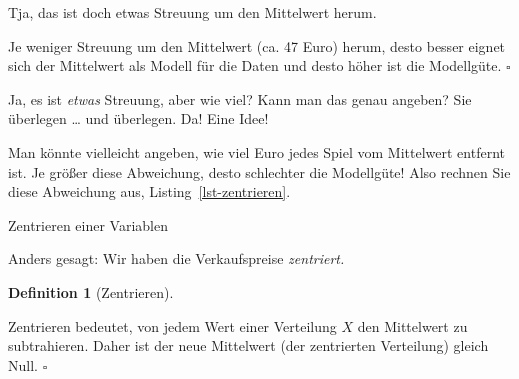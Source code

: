\documentclass[
  letterpaper,
  twoside,
  open=any]{scrbook}
\newenvironment{Shaded}{\begin{snugshade}}{\end{snugshade}}
\newcommand{\AttributeTok}[1]{\textcolor[rgb]{0.40,0.45,0.13}{#1}}
\newcommand{\FloatTok}[1]{\textcolor[rgb]{0.68,0.00,0.00}{#1}}
\newcommand{\FunctionTok}[1]{\textcolor[rgb]{0.28,0.35,0.67}{#1}}
\newcommand{\NormalTok}[1]{\textcolor[rgb]{0.00,0.23,0.31}{#1}}
\newcommand{\OtherTok}[1]{\textcolor[rgb]{0.00,0.23,0.31}{#1}}
\newcommand{\SpecialCharTok}[1]{\textcolor[rgb]{0.37,0.37,0.37}{#1}}
\theoremstyle{definition}
\theoremstyle{definition}
\theoremstyle{definition}
\newtheorem{definition}{Definition}[chapter]
\theoremstyle{remark}
\begin{document}
Tja, das ist doch etwas Streuung um den Mittelwert herum.

\begin{tcolorbox}[enhanced jigsaw, colframe=quarto-callout-important-color-frame, arc=.35mm, leftrule=.75mm, bottomtitle=1mm, titlerule=0mm, colbacktitle=quarto-callout-important-color!10!white, breakable, bottomrule=.15mm, colback=white, left=2mm, rightrule=.15mm, opacityback=0, toptitle=1mm, toprule=.15mm, opacitybacktitle=0.6, title=\textcolor{quarto-callout-important-color}{\faExclamation}\hspace{0.5em}{Wichtig}, coltitle=black]

Je weniger Streuung um den Mittelwert (ca. 47 Euro) herum, desto besser
eignet sich der Mittelwert als Modell für die Daten und desto höher ist
die Modellgüte. \(\square\)

\end{tcolorbox}

Ja, es ist \emph{etwas} Streuung, aber wie viel? Kann man das genau
angeben? Sie überlegen \ldots{} und überlegen. Da! Eine Idee!

Man könnte vielleicht angeben, wie viel Euro jedes Spiel vom Mittelwert
entfernt ist. Je größer diese Abweichung, desto schlechter die
Modellgüte! Also rechnen Sie diese Abweichung aus,
Listing~\ref{lst-zentrieren}.

\begin{codelisting}

\caption{\label{lst-zentrieren}Zentrieren einer Variablen}

\centering{

\begin{Shaded}
\begin{Highlighting}[]
\NormalTok{mariokart\_no\_extreme }\OtherTok{\textless{}{-}}
\NormalTok{  mariokart\_no\_extreme }\SpecialCharTok{\%\textgreater{}\%} 
  \FunctionTok{mutate}\NormalTok{(}\AttributeTok{abw =} \FloatTok{47.4} \SpecialCharTok{{-}}\NormalTok{ total\_pr)}
\end{Highlighting}
\end{Shaded}

}

\end{codelisting}%

Anders gesagt: Wir haben die Verkaufspreise \emph{zentriert.}

\begin{definition}[Zentrieren]\protect\hypertarget{def-zentrieren}{}\label{def-zentrieren}

Zentrieren bedeutet, von jedem Wert einer Verteilung \(X\) den
Mittelwert zu subtrahieren. Daher ist der neue Mittelwert (der
zentrierten Verteilung) gleich Null. \(\square\)

\end{definition}
\end{document}
